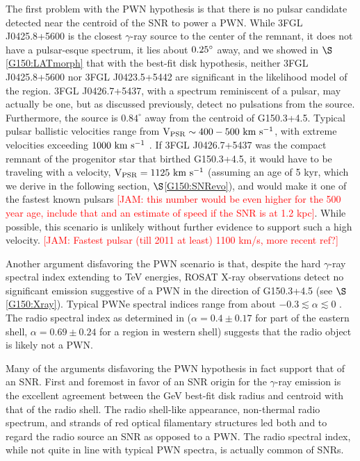 \documentclass[iop]{emulateapj}
\newcommand{\kibitz}[2]{\ifnum\Comments=1\textcolor{#1}{#2}\fi}
\newcommand{\jamie}[1]{\kibitz{red}      {[JAM: #1]}}
\newcommand{\gam}{$\gamma$-ray}
\newcommand{\Gone}{G150.3+4.5}
\newcommand{\psrLike}{3FGL J0426.7+5437}
\begin{document}
The first problem with the PWN hypothesis is that there is no pulsar candidate detected near the centroid of the SNR to power a PWN. While 3FGL J0425.8+5600 is the closest \gam{} source to the center of the remnant, it does not have a pulsar-esque spectrum, it lies about ${\rm 0.25^\circ }$ away, and we showed in $\S$\ref{G150:LATmorph} that with the best-fit disk hypothesis, neither 3FGL J0425.8+5600 nor 3FGL J0423.5+5442 are significant in the likelihood model of the region. \psrLike{}, with a spectrum reminiscent of a pulsar,  may actually be one, but as discussed previously, \cite{Barr13} detect no pulsations from the source. %
 Furthermore, the source is $0.84^\circ$ away from the centroid of \Gone{}. Typical pulsar ballistic velocities range from ${\rm V_{PSR} \sim 400-500~km~s^{-1}}$, with extreme velocities exceeding ${\rm 1000~km~s^{-1}}$ \citep{Gaensler06}. If \psrLike{} was the compact remnant of the progenitor star that birthed \Gone{}, it would have to be traveling with a velocity, ${\rm V_{PSR} = 1125~km~s^{-1}}$ (assuming an age of 5 kyr, which we derive in the following section, $\S$\ref{G150:SNRevo}), and would make it one of the fastest known pulsars \citep{Chatterjee05} \jamie{this number would be even higher for the 500 year age, include that and an estimate of speed if the SNR is at 1.2 kpc}. While possible, this scenario is unlikely without further evidence to support such a high velocity. \jamie{Fastest pulsar (till 2011 at least) 1100 km/s, more recent ref?}

Another argument disfavoring the PWN scenario is that, despite the hard \gam{} spectral index extending to TeV energies, ROSAT X-ray observations detect no significant emission suggestive of a PWN in the direction of \Gone{} (see  $\S$\ref{G150:Xray}). 
Typical PWNe spectral indices range from about $-0.3 \lesssim \alpha  \lesssim  0$ \citep{Gaensler06}. The radio spectral index  as determined in \cite{Gao14}  ($\alpha = 0.4 \pm 0.17$ for part of the eastern shell, $\alpha = 0.69 \pm 0.24$ for a region in western shell) suggests that the radio object is likely not a PWN.

Many of the arguments disfavoring the PWN hypothesis in fact support that of an SNR. First and foremost in favor of an SNR origin for the \gam{} emission is the excellent agreement between the GeV best-fit disk radius and centroid with that of the radio shell.  The radio shell-like appearance, non-thermal radio spectrum, and strands of red optical filamentary structures led both \cite{Gao14} and \cite{Gerbrandt14} to regard the radio source an SNR as opposed to a PWN.  The radio spectral index, while not quite in line with typical PWN spectra, is actually  common of SNRs.
\end{document}
